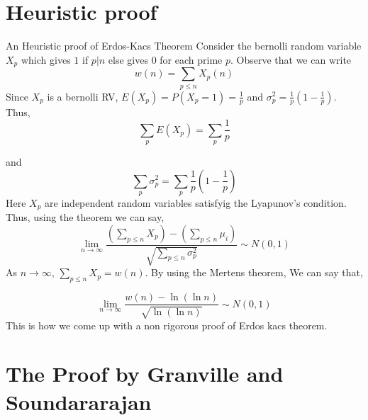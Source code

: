 \documentclass{beamer}
\numberwithin{theorem}{section}
\theoremstyle{definition}
\begin{document}
    \section{Heuristic proof}
    \begin{frame}{An Heuristic proof of Erdos-Kacs Theorem}
    Consider the bernolli random variable $X_p$ which gives $1$ if $p|n$ else  gives $0$ for each prime $p$. Observe that we can write $$w(n)=\sum_{p\le n}X_p(n)$$
    Since $X_p$ is a bernolli RV, $E(X_p)=P(X_p=1)=\frac{1}{p}$ and $\sigma_p^2=\frac{1}{p}\left(1-\frac{1}{p}\right)$.
    Thus,
    $$\sum_{p}E(X_p)=\sum_{p}\frac{1}{p}$$        
    \end{frame}
    \begin{frame}{}
    and $$\sum_{p}\sigma_p^2=\sum_{p}\frac{1}{p}\left(1-\frac{1}{p}\right)$$
    Here $X_p$ are independent random variables satisfyig the Lyapunov's condition. Thus, using the theorem we can say,
    $$\lim_{n\rightarrow\infty}\frac{(\sum_{p\le n}X_p)-(\sum_{p\le n}\mu_i)}{\sqrt{\sum_{p\le n}\sigma_p^2}}\sim N(0,1)$$
    As $n\rightarrow\infty$, $\sum_{p\le n}X_p=w(n)$.
    By using the Mertens theorem,
    We can say that,
        
    \end{frame}
\begin{frame}{}
    $$\lim_{n\rightarrow\infty}\frac{w(n)-\ln(\ln n)}{\sqrt{\ln(\ln n)}}\sim N(0,1)$$
    This is how we come up with a non rigorous proof of Erdos kacs theorem.
\end{frame}
\section{The Proof by Granville and Soundararajan}
\end{document}
